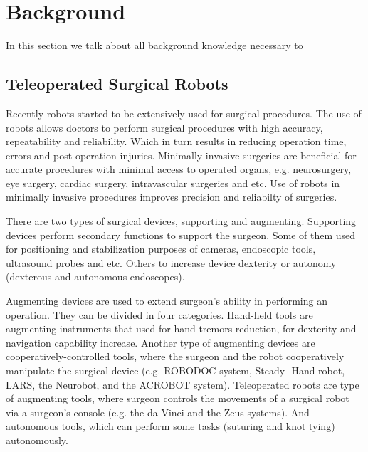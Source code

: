\chapter{Background}
\label{back}

In this section we talk about all background knowledge necessary to 

\section{Teleoperated Surgical Robots}
\label{sec:daVinci}
Recently robots started to be extensively used for surgical procedures. The use of robots allows doctors to perform surgical procedures with high accuracy, repeatability and reliability. Which in turn results in reducing operation time, errors and post-operation injuries. Minimally invasive surgeries are beneficial for accurate procedures with minimal access to operated organs, e.g. neurosurgery, eye surgery, cardiac surgery, intravascular surgeries and etc.  Use of robots in minimally invasive procedures improves precision and reliabilty of surgeries. \cite{tavakoli_haptics_2008}

There are two types of surgical devices, supporting and augmenting. 
Supporting devices perform secondary functions to support the surgeon.  Some of them used for positioning and stabilization purposes of cameras, endoscopic tools, ultrasound probes and etc. Others to increase device dexterity or autonomy (dexterous and autonomous endoscopes).

Augmenting devices are used to extend surgeon's ability in performing an operation. They can be divided in four categories. Hand-held tools are augmenting instruments that used for hand tremors reduction, for dexterity and navigation capability increase. Another type of augmenting devices are cooperatively-controlled tools, where the surgeon and the robot cooperatively manipulate the surgical device (e.g. ROBODOC system, Steady- Hand robot, LARS, the Neurobot, and the ACROBOT system). Teleoperated robots are type of augmenting tools, where surgeon controls the movements of a surgical robot via a surgeon's console (e.g. the da Vinci and the Zeus systems). And autonomous tools, which can perform some tasks (suturing and knot tying) autonomously. \cite{tavakoli_haptics_2008}


